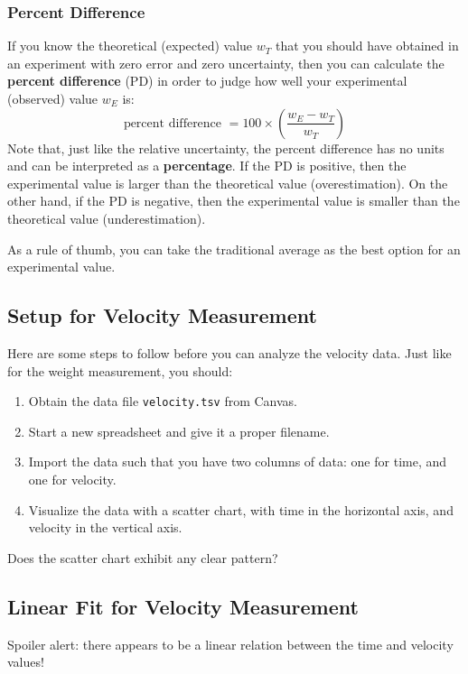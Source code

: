 \subsubsection{Percent Difference}
%
If you know the theoretical (expected) value $w_{T}$ that you should have obtained in an experiment with zero error and zero uncertainty, then you can calculate the \textbf{percent difference} (PD) in order to judge how well your experimental (observed) value $w_{E}$ is:
\begin{equation}
    \text{percent difference } = 100 \times \left( \frac{w_{E} - w_{T}}{w_{T}} \right)
    \label{eq:00.percent.diff}
\end{equation}
Note that, just like the relative uncertainty, the percent difference has no units and can be interpreted as a \textbf{percentage}. If the PD is positive, then the experimental value is larger than the theoretical value (overestimation). On the other hand, if the PD is negative, then the experimental value is smaller than the theoretical value (underestimation).

As a rule of thumb, you can take the traditional average as the best option for an experimental value.
%
\subsection{Setup for Velocity Measurement}
%
Here are some steps to follow before you can analyze the velocity data. Just like for the weight measurement, you should:
\begin{enumerate}
    \item Obtain the data file \texttt{velocity.tsv} from Canvas.
    \item Start a new spreadsheet and give it a proper filename.
    \item Import the data such that you have two columns of data: one for time, and one for velocity.
    \item Visualize the data with a scatter chart, with time in the horizontal axis, and velocity in the vertical axis.
\end{enumerate}
Does the scatter chart exhibit any clear pattern?
%
\begin{center}
\end{center}
%
\subsection{Linear Fit for Velocity Measurement}
%
Spoiler alert: there appears to be a linear relation between the time and velocity values!

